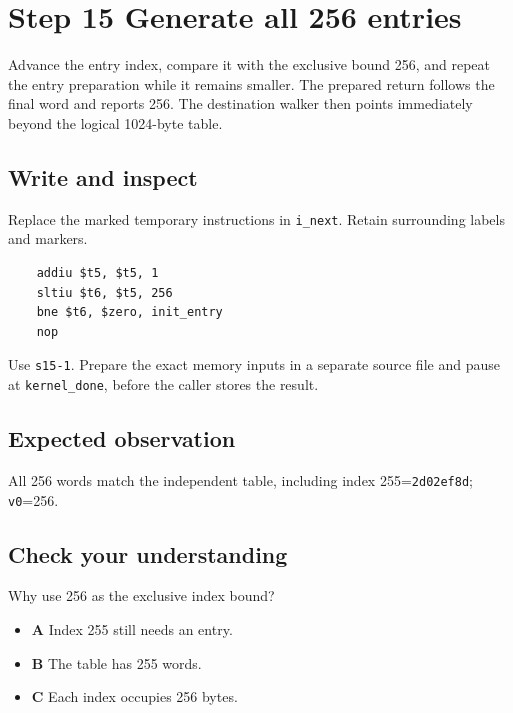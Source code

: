 \section{Step 15 Generate all 256 entries}\label{crc-s15}

Advance the entry index, compare it with the exclusive bound 256, and repeat the entry preparation while it remains smaller. The prepared return follows the final word and reports 256. The destination walker then points immediately beyond the logical 1024-byte table.

\subsection{Write and inspect}
Replace the marked temporary instructions in \texttt{i\_next}. Retain surrounding labels and markers.

\begin{verbatim}
    addiu $t5, $t5, 1
    sltiu $t6, $t5, 256
    bne $t6, $zero, init_entry
    nop
\end{verbatim}

Use \texttt{s15-1}. Prepare the exact memory inputs in a separate source file and pause at \texttt{kernel\_done}, before the caller stores the result.

\subsection{Expected observation}
All 256 words match the independent table, including index 255=\texttt{2d02ef8d}; \texttt{v0}=256.

\subsection{Check your understanding}
Why use 256 as the exclusive index bound?

\begin{itemize}
  \item \textbf{A} Index 255 still needs an entry.
  \item \textbf{B} The table has 255 words.
  \item \textbf{C} Each index occupies 256 bytes.
\end{itemize}
